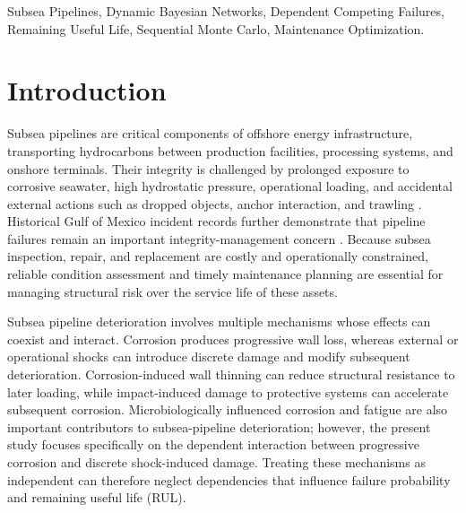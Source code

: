 \documentclass[journal]{IEEEtran}
\begin{document}
\begin{IEEEkeywords}
Subsea Pipelines, Dynamic Bayesian Networks, Dependent Competing Failures,
Remaining Useful Life, Sequential Monte Carlo, Maintenance Optimization.
\end{IEEEkeywords}

\section{Introduction}
\label{sec:introduction}

Subsea pipelines are critical components of offshore energy
infrastructure, transporting hydrocarbons between production
facilities, processing systems, and onshore terminals. Their integrity
is challenged by prolonged exposure to corrosive seawater, high
hydrostatic pressure, operational loading, and accidental external
actions such as dropped objects, anchor interaction, and trawling
\cite{dnvf107}. Historical Gulf of Mexico incident
records further demonstrate that pipeline failures remain an important
integrity-management concern \cite{romeo2024,pfander2024}. Because subsea
inspection, repair, and replacement are costly and operationally
constrained, reliable condition assessment and timely maintenance
planning are essential for managing structural risk over the service
life of these assets.

Subsea pipeline deterioration involves multiple mechanisms whose
effects can coexist and interact. Corrosion produces progressive wall
loss, whereas external or operational shocks can introduce discrete
damage and modify subsequent deterioration. Corrosion-induced wall
thinning can reduce structural resistance to later loading, while
impact-induced damage to protective systems can accelerate subsequent
corrosion. Microbiologically influenced corrosion \cite{yazdi2023} and
fatigue are also important contributors to subsea-pipeline
deterioration; however, the present study focuses
specifically on the dependent interaction between progressive
corrosion and discrete shock-induced damage. Treating these mechanisms
as independent can therefore neglect dependencies that influence
failure probability and remaining useful life (RUL).
\end{document}
